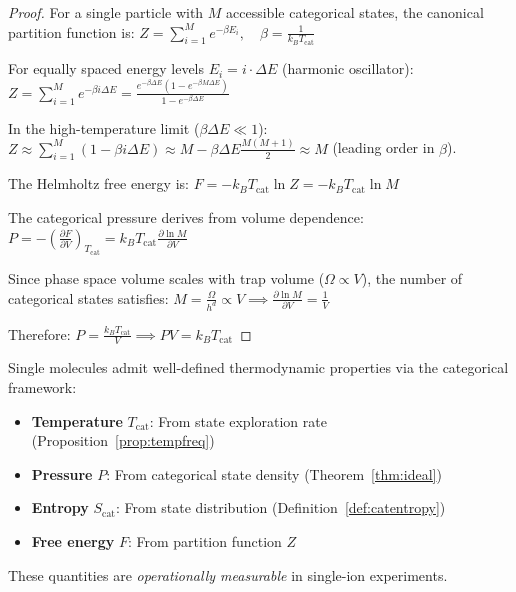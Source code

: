 \begin{proof}
For a single particle with $M$ accessible categorical states, the canonical partition function is:
$
Z = \sum_{i=1}^{M} e^{-\beta E_i}, \quad \beta = \frac{1}{k_B T_{\mathrm{cat}}}
$

For equally spaced energy levels $E_i = i \cdot \Delta E$ (harmonic oscillator):
$
Z = \sum_{i=1}^{M} e^{-\beta i \Delta E} = \frac{e^{-\beta \Delta E}(1 - e^{-\beta M \Delta E})}{1 - e^{-\beta \Delta E}}
$

In the high-temperature limit ($\beta \Delta E \ll 1$):
$
Z \approx \sum_{i=1}^{M} (1 - \beta i \Delta E) \approx M - \beta \Delta E \frac{M(M+1)}{2} \approx M
$
(leading order in $\beta$).

The Helmholtz free energy is:
$
F = -k_B T_{\mathrm{cat}} \ln Z = -k_B T_{\mathrm{cat}} \ln M
$

The categorical pressure derives from volume dependence:
$
P = -\left(\frac{\partial F}{\partial V}\right)_{T_{\mathrm{cat}}} = k_B T_{\mathrm{cat}} \frac{\partial \ln M}{\partial V}
$

Since phase space volume scales with trap volume ($\Omega \propto V$), the number of categorical states satisfies:
$
M = \frac{\Omega}{h^d} \propto V \implies \frac{\partial \ln M}{\partial V} = \frac{1}{V}
$

Therefore:
$
P = \frac{k_B T_{\mathrm{cat}}}{V} \implies PV = k_B T_{\mathrm{cat}}
$
\end{proof}

\begin{corollary}
\label{cor:singlemol}
Single molecules admit well-defined thermodynamic properties via the categorical framework:
\begin{itemize}
    \item \textbf{Temperature} $T_{\mathrm{cat}}$: From state exploration rate (Proposition~\ref{prop:tempfreq})
    \item \textbf{Pressure} $P$: From categorical state density (Theorem~\ref{thm:ideal})
    \item \textbf{Entropy} $S_{\mathrm{cat}}$: From state distribution (Definition~\ref{def:catentropy})
    \item \textbf{Free energy} $F$: From partition function $Z$
\end{itemize}
These quantities are \emph{operationally measurable} in single-ion experiments.
\end{corollary}



